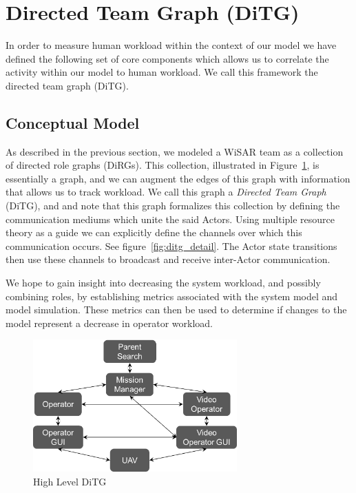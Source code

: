 \section{Directed Team Graph (DiTG)}

In order to measure human workload within the context of our model \cite{gledhill2013modelinguas} we
have defined the following set of core components which allows us to correlate
the activity within our model to human workload.  We call this framework the
directed team graph (DiTG).

\subsection{Conceptual Model}
As described in the previous section, we modeled a WiSAR team as a collection of directed role graphs
(DiRGs).  This collection, illustrated in Figure~\ref{fig:ditg}, is essentially a graph, and we can augment the edges of this graph with information that allows us to track workload.  We call this graph a {\em Directed Team Graph} (DiTG), and and note that this graph formalizes this collection by defining the communication mediums which
unite the said Actors.  Using multiple resource theory\cite{wickens2002multiple}
as a guide we can explicitly define the channels over which this communication occurs.  See
figure~\ref{fig:ditg_detail}.  The Actor state transitions then use these
channels to broadcast and receive inter-Actor communication.  

We hope to gain
insight into decreasing the system workload, and possibly combining roles, by
establishing metrics associated with the system model and model simulation. 
These metrics can then be used to determine if changes to the model represent a
decrease in operator workload.

\begin{figure}
\center
\setlength{\abovecaptionskip}{1mm}
\setlength{\belowcaptionskip}{1mm}
\setlength{\textfloatsep}{1mm}
\setlength{\floatsep}{1mm}
\includegraphics[height=2in]{ditg.png}
\caption{High Level DiTG}
\label{fig:ditg}
\end{figure}

